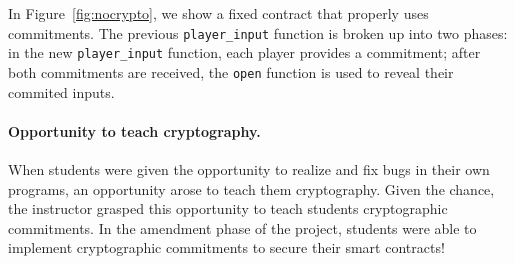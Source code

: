 \documentclass[10pt,twocolumn,letterpaper]{article}
\newcommand{\elaine}[1]{}
\newcommand{\ignore}[1]{}
\begin{document}
In Figure~\ref{fig:nocrypto}, we show a fixed contract that properly uses commitments. The previous \texttt{player\_input} function is broken up into two phases: in the new \texttt{player\_input} function, each player provides a commitment; after both commitments are received, the \texttt{open} function is used to reveal their commited inputs.

\paragraph{Opportunity to teach cryptography.}
When students were given the opportunity to realize and fix bugs 
in their own programs, an opportunity arose to  
teach them cryptography.
Given the chance, the instructor
grasped this opportunity to teach students cryptographic commitments. 
In the amendment phase of the project,
students were able to implement cryptographic commitments
to secure their smart contracts!




\ignore{
Cryptography is often the first line of defense against security hazards in smart contract programming. In the example above, players reveal too much plaintext information, which can be used by an attacker to spoil the game. In the section, we'll describe how to apply cryptographic commitments to fix this problem.

In our RPS contract the user is using a numeric scale as their input with 0: rock, 1: paper, 2: scissors. Let's take a look at the function that registers their inputs and think about possible vulnerabilities:
}


\elaine{in figures, can we put in framed boxes the lines
that have problems.}
\end{document}
